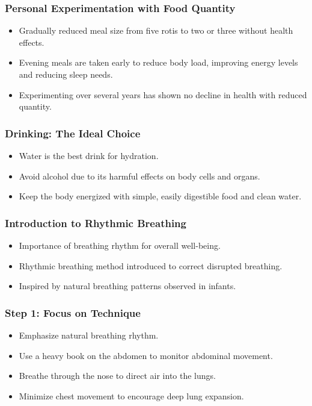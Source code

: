 \begin{frame}[fragile]\frametitle{Personal Experimentation with Food Quantity}
    \begin{itemize}
        \item Gradually reduced meal size from five rotis to two or three without health effects.
        \item Evening meals are taken early to reduce body load, improving energy levels and reducing sleep needs.
        \item Experimenting over several years has shown no decline in health with reduced quantity.
    \end{itemize}
\end{frame}

\begin{frame}[fragile]\frametitle{Drinking: The Ideal Choice}
    \begin{itemize}
        \item Water is the best drink for hydration.
        \item Avoid alcohol due to its harmful effects on body cells and organs.
        \item Keep the body energized with simple, easily digestible food and clean water.
    \end{itemize}
\end{frame}

\begin{frame}[fragile]\frametitle{Introduction to Rhythmic Breathing}
    \begin{itemize}
        \item Importance of breathing rhythm for overall well-being.
        \item Rhythmic breathing method introduced to correct disrupted breathing.
        \item Inspired by natural breathing patterns observed in infants.
    \end{itemize}
\end{frame}

\begin{frame}[fragile]\frametitle{Step 1: Focus on Technique}
    \begin{itemize}
        \item Emphasize natural breathing rhythm.
        \item Use a heavy book on the abdomen to monitor abdominal movement.
        \item Breathe through the nose to direct air into the lungs.
        \item Minimize chest movement to encourage deep lung expansion.
    \end{itemize}
\end{frame}


